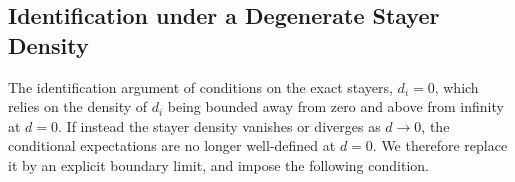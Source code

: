 \documentclass{article}
\newcommand{\E}{\mathbb{E}}
\newcommand{\I}{\mathbbm{1}}
\begin{document}
    


\subsection{Identification under a Degenerate Stayer Density}

The identification argument of \cite{grahampowell} conditions on the exact stayers, $d_i=0$, which relies on the density of $d_i$ being bounded away from zero and above from infinity at $d=0$. If instead the stayer density vanishes or diverges as $d\to0$, the conditional expectations are no longer well-defined at $d=0$. We therefore replace it by an explicit boundary limit, and impose the following condition.
\end{document}
